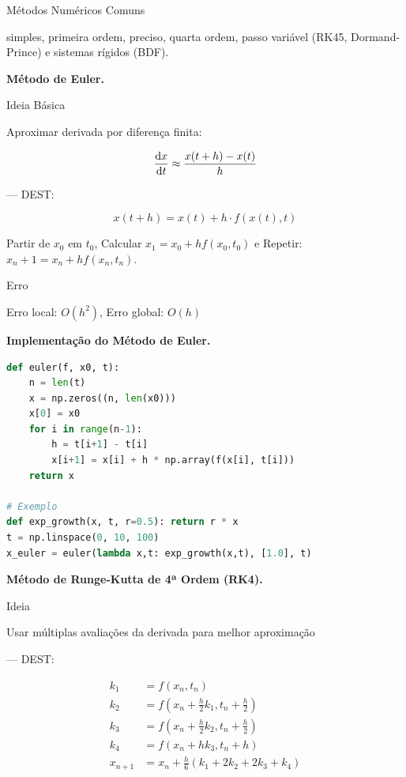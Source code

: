 Métodos Numéricos Comuns

simples, primeira ordem, preciso, quarta ordem, passo variável (RK45, Dormand-Prince) e sistemas rígidos (BDF).

\textbf{Método de Euler.}

Ideia Básica

Aproximar derivada por diferença finita:

%
\begin{equation*}
\frac{\mathrm{d} x}{\mathrm{d} t} \approx \frac{x(t+h) - x(t)}{h}
\end{equation*}
%

--- DEST: 

%
\begin{equation*}
x(t+h) = x(t) + h \cdot f(x(t), t)
\end{equation*}
%

Partir de $x_0$ em $t_0$, Calcular $x_1 = x_0 + h f(x_0, t_0)$ e Repetir: $x_n+1 = x_n + h f(x_n, t_n)$.

Erro

Erro local: $O(h^2)$, Erro global: $O(h)$

\textbf{Implementação do Método de Euler.}

%
\begin{lstlisting}[language=Python, caption=Euler forward, basicstyle=\ttfamily\footnotesize]
def euler(f, x0, t):
    n = len(t)
    x = np.zeros((n, len(x0)))
    x[0] = x0
    for i in range(n-1):
        h = t[i+1] - t[i]
        x[i+1] = x[i] + h * np.array(f(x[i], t[i]))
    return x

# Exemplo
def exp_growth(x, t, r=0.5): return r * x
t = np.linspace(0, 10, 100)
x_euler = euler(lambda x,t: exp_growth(x,t), [1.0], t)
\end{lstlisting}
%

\textbf{Método de Runge-Kutta de 4ª Ordem (RK4).}

Ideia

Usar múltiplas avaliações da derivada para melhor aproximação

--- DEST: 

%
\begin{align*}
k_1 &= f(x_n, t_n)\\
k_2 &= f(x_n + \frac{h}{2}k_1, t_n + \frac{h}{2})\\
k_3 &= f(x_n + \frac{h}{2}k_2, t_n + \frac{h}{2})\\
k_4 &= f(x_n + hk_3, t_n + h)\\
x_{n+1} &= x_n + \frac{h}{6}(k_1 + 2k_2 + 2k_3 + k_4)
\end{align*}
%

